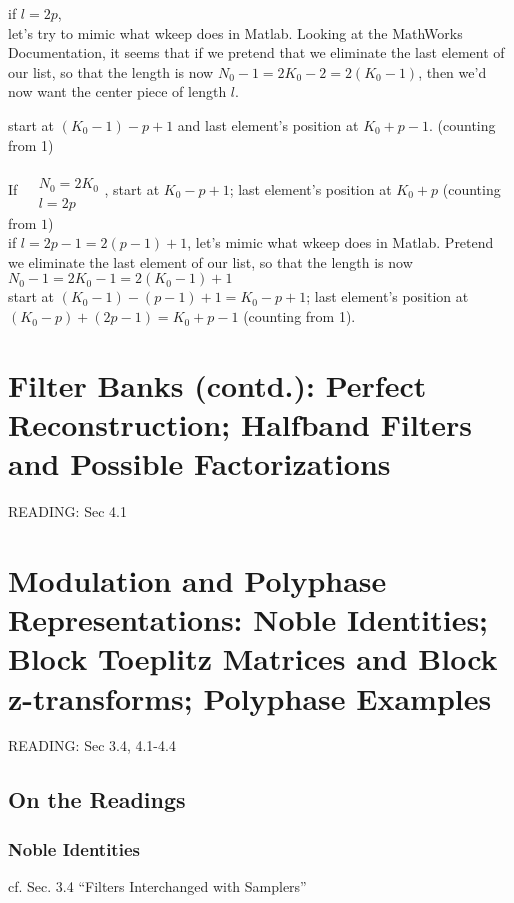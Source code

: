 \documentclass[twoside]{amsart}
\theoremstyle{plain}
\theoremstyle{definition}
\theoremstyle{remark}
\numberwithin{equation}{section}
\begin{document}
if $l=2p$, \\
let's try to mimic what wkeep does in Matlab.  Looking at the MathWorks Documentation, it seems that if we pretend that we eliminate the last element of our list, so that the length is now $N_0 -1 = 2K_0-2 = 2(K_0-1)$, then we'd now want the center piece of length $l$.  

start at $(K_0-1)-p+1$ and last element's position at $K_0 +p-1$.  (counting from 1) 

If $\begin{aligned} & \quad \\
  & N_0 = 2K_0 \\
  & l = 2p \end{aligned}$, start at $K_0 -p+1$; last element's position at $K_0 + p $ (counting from $1$) \\
if $l=2p-1 = 2(p-1)+1$, let's mimic what wkeep does in Matlab.  Pretend we eliminate the last element of our list, so that the length is now $N_0 - 1 = 2K_0 - 1 = 2(K_0-1)+1$ \\
\phantom{if } start at $(K_0-1) - (p-1)+1 = K_0-p+1$; last element's position at $(K_0-p) + (2p-1) = K_0+p-1 $ (counting from 1).  

\section{Filter Banks (contd.): Perfect Reconstruction; Halfband Filters and Possible Factorizations}

READING: Sec 4.1 \cite{GStrangTNguyen1996}

\section{Modulation and Polyphase Representations: Noble Identities; Block Toeplitz Matrices and Block z-transforms; Polyphase Examples}

READING: Sec 3.4, 4.1-4.4 \cite{GStrangTNguyen1996}

\subsection{On the Readings}

\subsubsection{Noble Identities}\label{SubSubSec:NobleIdentities}

cf. Sec. 3.4 ``Filters Interchanged with Samplers'' \cite{GStrangTNguyen1996}
\end{document}
